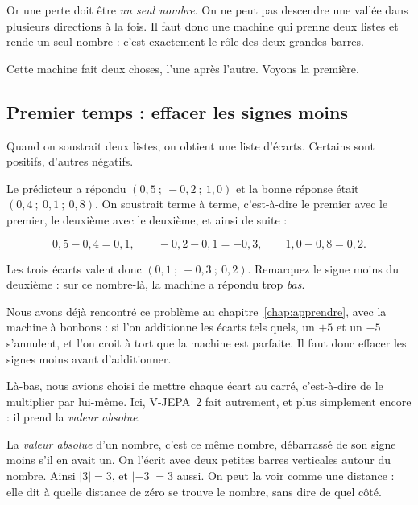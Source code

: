 Or une perte doit être \emph{un seul nombre}. On ne peut pas descendre une
vallée dans plusieurs directions à la fois. Il faut donc une machine qui
prenne deux listes et rende un seul nombre : c'est exactement le rôle des
deux grandes barres.

Cette machine fait deux choses, l'une après l'autre. Voyons la première.

\subsection*{Premier temps : effacer les signes moins}

Quand on soustrait deux listes, on obtient une liste d'écarts. Certains sont
positifs, d'autres négatifs.

\begin{exemple}
Le prédicteur a répondu $(0{,}5 \ ; \ -0{,}2 \ ; \ 1{,}0)$ et la bonne
réponse était $(0{,}4 \ ; \ 0{,}1 \ ; \ 0{,}8)$. On soustrait terme à
terme, c'est-à-dire le premier avec le premier, le deuxième avec le
deuxième, et ainsi de suite :

\[
  0{,}5 - 0{,}4 = 0{,}1 , \qquad
  -0{,}2 - 0{,}1 = -0{,}3 , \qquad
  1{,}0 - 0{,}8 = 0{,}2 .
\]

Les trois écarts valent donc $(0{,}1 \ ; \ -0{,}3 \ ; \ 0{,}2)$. Remarquez
le signe moins du deuxième : sur ce nombre-là, la machine a répondu trop
\emph{bas}.
\end{exemple}

Nous avons déjà rencontré ce problème au chapitre~\ref{chap:apprendre}, avec
la machine à bonbons : si l'on additionne les écarts tels quels, un $+5$ et
un $-5$ s'annulent, et l'on croit à tort que la machine est parfaite. Il
faut donc effacer les signes moins avant d'additionner.

Là-bas, nous avions choisi de mettre chaque écart au carré, c'est-à-dire de
le multiplier par lui-même. Ici, V-JEPA~2 fait autrement, et plus simplement
encore : il prend la \emph{valeur absolue}.

\begin{definition}
La \emph{valeur absolue} d'un nombre, c'est ce même nombre, débarrassé de
son signe moins s'il en avait un. On l'écrit avec deux petites barres
verticales autour du nombre. Ainsi $|3| = 3$, et $|-3| = 3$ aussi. On peut
la voir comme une distance : elle dit à quelle distance de zéro se trouve le
nombre, sans dire de quel côté.
\end{definition}


